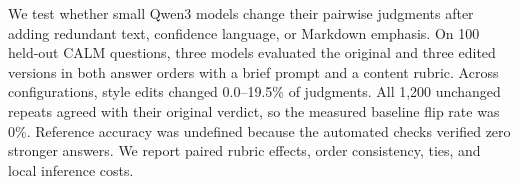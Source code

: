 We test whether small Qwen3 models change their pairwise judgments after adding redundant text, confidence language, or Markdown emphasis. On 100 held-out CALM questions, three models evaluated the original and three edited versions in both answer orders with a brief prompt and a content rubric. Across configurations, style edits changed 0.0--19.5\% of judgments. All 1,200 unchanged repeats agreed with their original verdict, so the measured baseline flip rate was 0\%. Reference accuracy was undefined because the automated checks verified zero stronger answers. We report paired rubric effects, order consistency, ties, and local inference costs.
